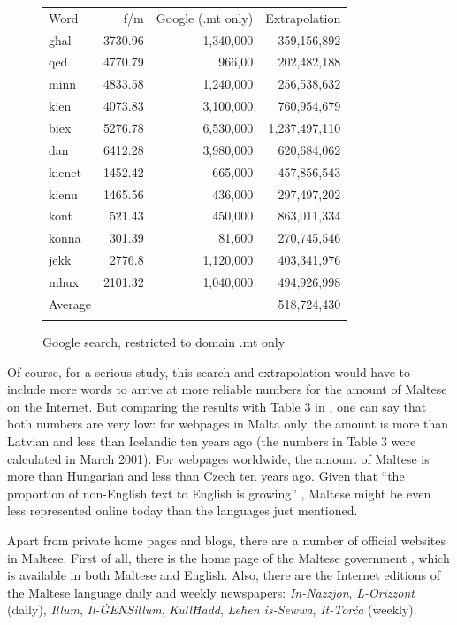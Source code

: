 \begin{multicols}{2}
\begin{figure}[p]
\setlength{\tabcolsep}{3.1em}
\begin{tabularx}{\textwidth}{lrrr} \toprule\addlinespace
Word & f/m & Google (.mt only) & Extrapolation \\ \addlinespace\midrule\addlinespace
għal & 3730.96 & 1,340,000 & 359,156,892 \\
qed	& 4770.79 & 966,00  &  202,482,188  \\
minn & 4833.58 & 1,240,000  &  256,538,632 \\
kien & 4073.83 & 3,100,000  &  760,954,679 \\
biex & 5276.78 & 6,530,000  & 1,237,497,110 \\
dan	& 6412.28  & 3,980,000  & 620,684,062  \\
kienet & 1452.42  & 665,000 &  457,856,543 \\
kienu & 1465.56  & 436,000  & 297,497,202  \\
kont & 521.43  & 450,000  &  863,011,334 \\
konna & 301.39  & 81,600  &   270,745,546\\
jekk & 2776.8  &  1,120,000 & 403,341,976 \\
mhux & 2101.32  & 1,040,000  &  494,926,998 \\ \addlinespace\midrule\addlinespace
Average & & & 518,724,430 \\ \addlinespace\bottomrule
\end{tabularx}
\caption{Google search, restricted to domain .mt only}
\label{table:Google_B_en}
\end{figure}

Of course, for a serious study, this search and extrapolation would have to include more words to arrive at more reliable numbers for the amount of Maltese on the Internet. But comparing the results with Table 3 in \cite{Kilgarriff-Grefenstette:2003}, one can say that both numbers are very low: for webpages in Malta only, the amount is more than Latvian and less than Icelandic ten years ago (the numbers in Table 3 were calculated in March 2001). For webpages worldwide, the amount of Maltese is more than Hungarian and less than Czech ten years ago. Given that ``the proportion of non-English text to English is growing'' \cite{Kilgarriff-Grefenstette:2003}, Maltese might be even less represented online today than the languages just mentioned.

Apart from private home pages and blogs, there are a number of official websites in Maltese. First of all, there is the home page of the Maltese government \cite{GovernmentOfMalta1}, which is available in both Maltese and English. Also, there are the Internet editions of the Maltese language daily and weekly newspapers: \emph{In-Nazzjon}, \emph{L-Orizzont} (daily), \emph{Illum}, \emph{Il-ĠENSillum}, \emph{KullĦadd}, \emph{Leħen is-Sewwa}, \emph{It-Torċa} (weekly).  


\end{multicols}
